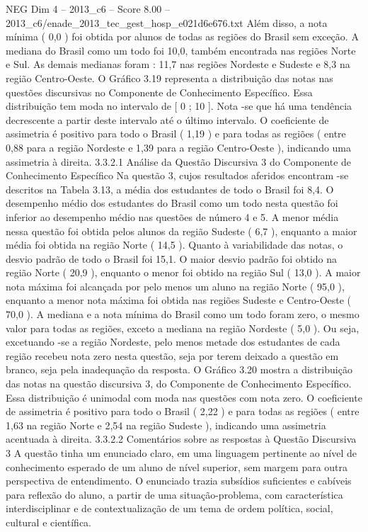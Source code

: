 \begin{textsample}{NEG Dim 4 – 2013\_c6 – Score 8.00 – 2013\_c6/enade\_2013\_tec\_gest\_hosp\_e021d6e676.txt}
Além disso, a nota mínima ( 0,0 ) foi obtida por alunos de todas as regiões do Brasil sem exceção.
A mediana do Brasil como um todo foi 10,0, também encontrada nas regiões Norte e Sul.
As demais medianas foram : 11,7 nas regiões Nordeste e Sudeste e 8,3 na região Centro-Oeste.
O Gráfico 3.19 representa a distribuição das notas nas questões discursivas no Componente de Conhecimento Específico.
Essa distribuição tem moda no intervalo de [ 0 ; 10 ].
Nota -se que há uma tendência decrescente a partir deste intervalo até o último intervalo.
O coeficiente de assimetria é positivo para todo o Brasil ( 1,19 ) e para todas as regiões ( entre 0,88 para a região Nordeste e 1,39 para a região Centro-Oeste ), indicando uma assimetria à direita. 3.3.2.1 Análise da Questão Discursiva 3 do Componente de Conhecimento Específico Na questão 3, cujos resultados aferidos encontram -se descritos na Tabela 3.13, a média dos estudantes de todo o Brasil foi 8,4.
O desempenho médio dos estudantes do Brasil como um todo nesta questão foi inferior ao desempenho médio nas questões de número 4 e 5.
A menor média nessa questão foi obtida pelos alunos da região Sudeste ( 6,7 ), enquanto a maior média foi obtida na região Norte ( 14,5 ).
Quanto à variabilidade das notas, o desvio padrão de todo o Brasil foi 15,1.
O maior desvio padrão foi obtido na região Norte ( 20,9 ), enquanto o menor foi obtido na região Sul ( 13,0 ).
A maior nota máxima foi alcançada por pelo menos um aluno na região Norte ( 95,0 ), enquanto a menor nota máxima foi obtida nas regiões Sudeste e Centro-Oeste ( 70,0 ).
A mediana e a nota mínima do Brasil como um todo foram zero, o mesmo valor para todas as regiões, exceto a mediana na região Nordeste ( 5,0 ).
Ou seja, excetuando -se a região Nordeste, pelo menos metade dos estudantes de cada região recebeu nota zero nesta questão, seja por terem deixado a questão em branco, seja pela inadequação da resposta.
O Gráfico 3.20 mostra a distribuição das notas na questão discursiva 3, do Componente de Conhecimento Específico.
Essa distribuição é unimodal com moda nas questões com nota zero.
O coeficiente de assimetria é positivo para todo o Brasil ( 2,22 ) e para todas as regiões ( entre 1,63 na região Norte e 2,54 na região Sudeste ), indicando uma assimetria acentuada à direita. 3.3.2.2 Comentários sobre as respostas à Questão Discursiva 3 A questão tinha um enunciado claro, em uma linguagem pertinente ao nível de conhecimento esperado de um aluno de nível superior, sem margem para outra perspectiva de entendimento.
O enunciado trazia subsídios suficientes e cabíveis para reflexão do aluno, a partir de uma situação-problema, com característica interdisciplinar e de contextualização de um tema de ordem política, social, cultural e científica.

\end{textsample}
